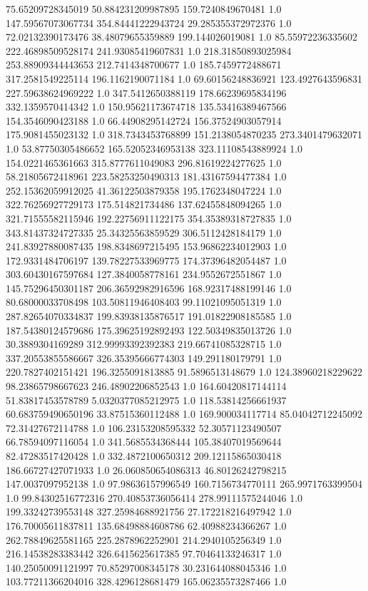 75.65209728345019	50.884231209987895	159.7240849670481	1.0
147.59567073067734	354.84441222943724	29.285355372972376	1.0
72.02132390173476	38.48079655359889	199.144026019081	1.0
85.55972236335602	222.46898509528174	241.93085419607831	1.0
218.31850893025984	253.88909344443653	212.7414348700677	1.0
185.7459772488671	317.2581549225114	196.1162190071184	1.0
69.60156248836921	123.4927643596831	227.59638624969222	1.0
347.5412650388119	178.66239695834196	332.1359570414342	1.0
150.95621173674718	135.53416389467566	154.3546090423188	1.0
66.44908295142724	156.37524903057914	175.9081455023132	1.0
318.7343453768899	151.2138054870235	273.3401479632071	1.0
53.87750305486652	165.52052346953138	323.11108543889924	1.0
154.0221465361663	315.8777611049083	296.81619224277625	1.0
58.21805672418961	223.58253250490313	181.43167594477384	1.0
252.15362059912025	41.36122503879358	195.1762348047224	1.0
322.76256927729173	175.514821734486	137.62455848094265	1.0
321.71555582115946	192.22756911122175	354.35389318727835	1.0
343.81437324727335	25.34325563859529	306.5112428184179	1.0
241.83927880087435	198.8348697215495	153.96862234012903	1.0
172.9331484706197	139.78227533969775	174.37396482054487	1.0
303.60430167597684	127.3840058778161	234.9552672551867	1.0
145.75296450301187	206.36592982916596	168.92317488199146	1.0
80.68000033708498	103.50811946408403	99.11021095051319	1.0
287.82654070334837	199.83938135876517	191.01822908185585	1.0
187.54380124579686	175.39625192892493	122.50349835013726	1.0
30.3889304169289	312.99993392392383	219.66741085328715	1.0
337.20553855586667	326.35395666774303	149.291180179791	1.0
220.7827402151421	196.3255091813885	91.5896513148679	1.0
124.38960218229622	98.23865798667623	246.48902206852543	1.0
164.60420817144114	51.83817453578789	5.0320377085212975	1.0
118.53814256661937	60.683759490650196	33.87515360112488	1.0
169.900034117714	85.04042712245092	72.31427672114788	1.0
106.23153208595332	52.30571123490507	66.78594097116054	1.0
341.5685534368444	105.38407019569644	82.47283517420428	1.0
332.4872100650312	209.12115865030418	186.66727427071933	1.0
26.060850654086313	46.80126242798215	147.0037097952138	1.0
97.98636157996549	160.7156734770111	265.9971763399504	1.0
99.84302516772316	270.40853736056414	278.99111575244046	1.0
199.33242739553148	327.25984688921756	27.172218216497942	1.0
176.70005611837811	135.68498884608786	62.40988234366267	1.0
262.78849625581165	225.2878962252901	214.2940105256349	1.0
216.14538283383442	326.6415625617385	97.70464133246317	1.0
140.25050091121997	70.85297008345178	30.231644088045346	1.0
103.77211366204016	328.4296128681479	165.06235573287466	1.0
